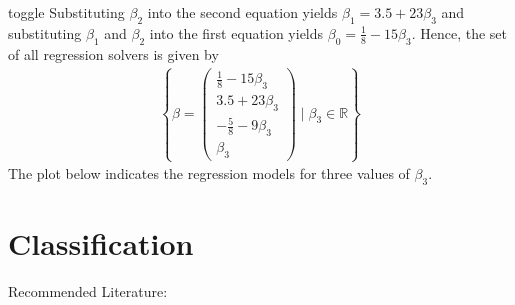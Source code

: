 \documentclass[letterpaper,10pt,english]{jupyterBook}
\begin{document}
\begin{enumerate}
\begin{enumerate}
\begin{sphinxuseclass}{toggle}
Substituting \(\beta_2\) into the second equation yields \(\beta_1 = 3.5 +23\beta_3 \) and substituting \(\beta_1\) and \(\beta_2\) into the first equation yields \(\beta_0 = \frac{1}{8}-15\beta_3\). Hence, the set of all regression solvers is given by
\begin{equation*}
\begin{split}\left\{\beta = \begin{pmatrix}\frac{1}{8}-15\beta_3\\3.5 +23\beta_3\\-\frac{5}{8} -9\beta_3\\\beta_3 \end{pmatrix} \mid \beta_3\in\mathbb{R} \right\}\end{split}
\end{equation*}
The plot below indicates the regression models for three values of \(\beta_3\).
\begin{center}\end{center}
\end{sphinxuseclass}
\end{enumerate}

\end{enumerate}

\sphinxstepscope


\chapter{Classification}
\label{\detokenize{classification:classification}}\label{\detokenize{classification::doc}}
\sphinxAtStartPar
Recommended Literature:
\end{document}
